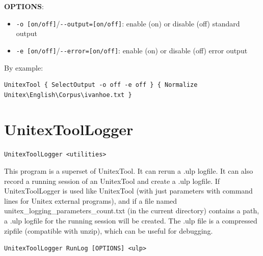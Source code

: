 \bigskip
\noindent \textbf{OPTIONS}:
\begin{itemize}
\item \verb+-o [on/off]+/\verb+--output=[on/off]+: enable (on) or disable (off) standard output
\item \verb+-e [on/off]+/\verb+--error=[on/off]+: enable (on) or disable (off) error output
\end{itemize} 


\noindent By example:
\begin{verbatim}
UnitexTool { SelectOutput -o off -e off } { Normalize
Unitex\English\Corpus\ivanhoe.txt }
\end{verbatim}






\section{UnitexToolLogger}
\label{section-UnitexToolLogger}
\verb+UnitexToolLogger <utilities>+

\bigskip
\noindent This program is a superset of UnitexTool. It can rerun a .ulp logfile.
It can also record a running session of an UnitexTool and create a .ulp logfile.
If UnitexToolLogger is used like UnitexTool (with just parameters with command lines for 
Unitex external programs), and if
a file named unitex\_logging\_parameters\_count.txt (in the current directory) contains a path, 
a .ulp logfile for the running session will be created.
The .ulp file is a compressed zipfile (compatible with unzip), which can be useful for debugging.

\bigskip
\verb+UnitexToolLogger RunLog [OPTIONS] <ulp>+

